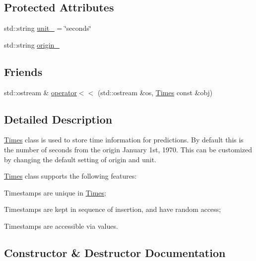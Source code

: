 \subsection*{Protected Attributes}
\begin{DoxyCompactItemize}
\item 
std\+::string \mbox{\hyperlink{classanen_time_1_1_times_a1bc1f74d961af9efa6462b2cbe5f3718}{unit\+\_\+}} = \char`\"{}seconds\char`\"{}
\item 
std\+::string \mbox{\hyperlink{classanen_time_1_1_times_a7e08602fb0628df1c5f1cccbb98baeb1}{origin\+\_\+}}
\end{DoxyCompactItemize}
\subsection*{Friends}
\begin{DoxyCompactItemize}
\item 
std\+::ostream \& \mbox{\hyperlink{classanen_time_1_1_times_a0c37c7d9833e9b02d1a219555f55fe34}{operator$<$$<$}} (std\+::ostream \&os, \mbox{\hyperlink{classanen_time_1_1_times}{Times}} const \&obj)
\end{DoxyCompactItemize}


\subsection{Detailed Description}
\mbox{\hyperlink{classanen_time_1_1_times}{Times}} class is used to store time information for predictions. By default this is the number of seconds from the origin January 1st, 1970. This can be customized by changing the default setting of origin and unit. 

\mbox{\hyperlink{classanen_time_1_1_times}{Times}} class supports the following features\+:
\begin{DoxyEnumerate}
\item Timestamps are unique in \mbox{\hyperlink{classanen_time_1_1_times}{Times}};
\item Timestamps are kept in sequence of insertion, and have random access;
\item Timestamps are accessible via values. 
\end{DoxyEnumerate}

\subsection{Constructor \& Destructor Documentation}
\mbox{\label{classanen_time_1_1_times_a66161eb232f580fe090579b8e19e3618}} 
